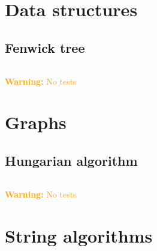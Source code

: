 \documentclass{article}
\begin{document}
\tableofcontents

\newpage

\section{Data structures}
\subsection{Fenwick tree}
\inputminted[mathescape, breaklines, tabsize=4, frame=lines, linenos=true]{c++}{./data-structures/fenwick-tree/fenwick-tree.cpp}
\textcolor{orange}{\textbf{Warning:} No tests}
\section{Graphs}
\subsection{Hungarian algorithm}
\inputminted[mathescape, breaklines, tabsize=4, frame=lines, linenos=true]{c++}{./graphs/hungarian_algorithm/hungarian_algorithm.cpp}
\textcolor{orange}{\textbf{Warning:} No tests}
\section{String algorithms}
\end{document}
